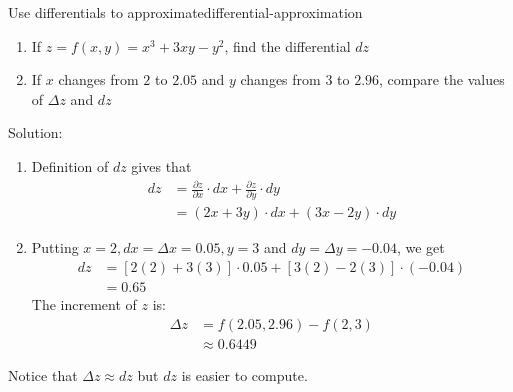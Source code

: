 \documentclass[math,code]{amznotes}
\theoremstyle{remark}
\begin{document}
\begin{exbox}{Use differentials to approximate}{differential-approximation}
    \begin{enumerate}
        \item If $z=f(x,y)=x^3+3xy-y^2$, find the differential $dz$
        \item If $x$ changes from $2$ to $2.05$ and $y$ changes from $3$ to $2.96$, compare the values of $\Delta z$ and $dz$
    \end{enumerate}
    {\color{blue} Solution}:
    \begin{enumerate}
        \item Definition of $dz$ gives that
        \begin{align*}
            dz&=\frac{\partial z}{\partial x}\cdot dx+\frac{\partial z}{\partial y}\cdot dy \\
            &=(2x+3y)\cdot dx+(3x-2y)\cdot dy  
        \end{align*}
        \item Putting $x=2, dx=\Delta x=0.05, y=3$ and $dy=\Delta y=-0.04$, we get
        \begin{align*}
            dz&=[2(2)+3(3)]\cdot 0.05+[3(2)-2(3)]\cdot (-0.04) \\
            &=0.65
        \end{align*}
        The increment of $z$ is:
        \begin{align*}
            \Delta z &= f(2.05,2.96)-f(2,3) \\
            &\approx0.6449
        \end{align*}
    \end{enumerate}
    Notice that $\Delta z \approx dz$ but $dz$ is easier to compute.
\end{exbox}
\end{document}
